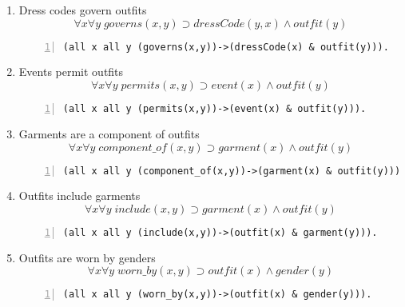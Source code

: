 \documentclass[paper=a4, fontsize=11pt]{scrartcl} %
\numberwithin{equation}{section} %
\numberwithin{figure}{section} %
\numberwithin{table}{section} %
\begin{document}
\begin{enumerate}

\item Dress codes govern outfits
\begin{equation*}
	\forall x \forall y \; governs(x,y) \supset dressCode(y,x) \land outfit(y)
\end{equation*}
\begin{Verbatim}[gobble=2, numbers=left]
	(all x all y (governs(x,y))->(dressCode(x) & outfit(y))).
\end{Verbatim}
	

\item Events permit outfits
\begin{equation*}
	\forall x \forall y \; permits(x,y) \supset event(x) \land outfit(y) 
\end{equation*}
\begin{Verbatim}[gobble=2, numbers=left]
	(all x all y (permits(x,y))->(event(x) & outfit(y))).
\end{Verbatim}
	

\item Garments are a component of outfits
\begin{equation*}
	\forall x \forall y \; component\_of(x,y) \supset garment(x) \land outfit(y)
\end{equation*}
\begin{Verbatim}[gobble=2, numbers=left]
	(all x all y (component_of(x,y))->(garment(x) & outfit(y))).
\end{Verbatim}
	

\item Outfits include garments
\begin{equation*}
	\forall x \forall y \; include(x,y) \supset garment(x) \land outfit(y)
\end{equation*}
\begin{Verbatim}[gobble=2, numbers=left]
	(all x all y (include(x,y))->(outfit(x) & garment(y))).
\end{Verbatim}


\item Outfits are worn by genders
\begin{equation*}
	\forall x \forall y \; worn\_by(x,y) \supset outfit(x) \land gender(y)
\end{equation*}
\begin{Verbatim}[gobble=2, numbers=left]
	(all x all y (worn_by(x,y))->(outfit(x) & gender(y))).
\end{Verbatim}


\end{enumerate}
\end{document}
